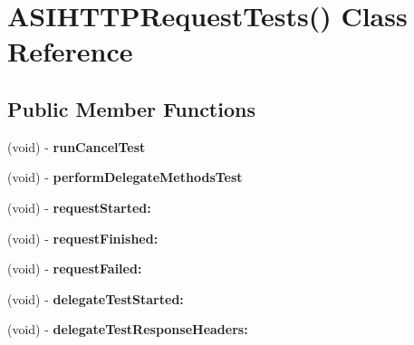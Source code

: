 \hypertarget{interface_a_s_i_h_t_t_p_request_tests_07_08}{
\section{\-A\-S\-I\-H\-T\-T\-P\-Request\-Tests() \-Class \-Reference}
\label{interface_a_s_i_h_t_t_p_request_tests_07_08}
}
\subsection*{\-Public \-Member \-Functions}
\begin{DoxyCompactItemize}
\item 
\hypertarget{interface_a_s_i_h_t_t_p_request_tests_07_08_ac8e0e9e1ecbb1ef2f9e032efecbedbe2}{
(void) -\/ {\bfseries run\-Cancel\-Test}}
\label{interface_a_s_i_h_t_t_p_request_tests_07_08_ac8e0e9e1ecbb1ef2f9e032efecbedbe2}

\item 
\hypertarget{interface_a_s_i_h_t_t_p_request_tests_07_08_add152db1f622a36f9886632a817f5bfb}{
(void) -\/ {\bfseries perform\-Delegate\-Methods\-Test}}
\label{interface_a_s_i_h_t_t_p_request_tests_07_08_add152db1f622a36f9886632a817f5bfb}

\item 
\hypertarget{interface_a_s_i_h_t_t_p_request_tests_07_08_af6bf87e820c7a74ae2dd38890b6f663d}{
(void) -\/ {\bfseries request\-Started\-:}}
\label{interface_a_s_i_h_t_t_p_request_tests_07_08_af6bf87e820c7a74ae2dd38890b6f663d}

\item 
\hypertarget{interface_a_s_i_h_t_t_p_request_tests_07_08_ad4608ed17343005e969118c0fffe51a9}{
(void) -\/ {\bfseries request\-Finished\-:}}
\label{interface_a_s_i_h_t_t_p_request_tests_07_08_ad4608ed17343005e969118c0fffe51a9}

\item 
\hypertarget{interface_a_s_i_h_t_t_p_request_tests_07_08_a7f546fc2ace9e16026e0588b7de4213c}{
(void) -\/ {\bfseries request\-Failed\-:}}
\label{interface_a_s_i_h_t_t_p_request_tests_07_08_a7f546fc2ace9e16026e0588b7de4213c}

\item 
\hypertarget{interface_a_s_i_h_t_t_p_request_tests_07_08_a87ec4cc26fad68eb77c614c9d10ad025}{
(void) -\/ {\bfseries delegate\-Test\-Started\-:}}
\label{interface_a_s_i_h_t_t_p_request_tests_07_08_a87ec4cc26fad68eb77c614c9d10ad025}

\item 
\hypertarget{interface_a_s_i_h_t_t_p_request_tests_07_08_a891a6dce8b0289a70fce0f43ed5ed403}{
(void) -\/ {\bfseries delegate\-Test\-Response\-Headers\-:}}
\label{interface_a_s_i_h_t_t_p_request_tests_07_08_a891a6dce8b0289a70fce0f43ed5ed403}


\end{DoxyCompactItemize}
